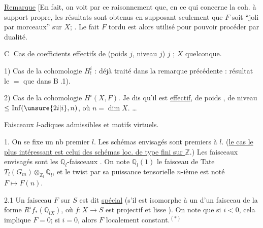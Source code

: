 
\uline{Remarque} [En fait, on voit par ce raisonnement que, en ce qui concerne la coh. à support propre, les résultats sont obtenus en supposant seulement que $F$ soit ``joli par morceaux'' sur $X$; . Le fait $F$  tordu  est alors utilisé  pour pouvoir procéder par dualité.

\textcircled{C} \uline{Cas de coefficients effectifs de (poids $j$, niveau $j$)} $j$ \uline{};
$X$ quelconque.

1) Cas de la cohomologie $H^i_!$ : déjà traité dans la remarque précédente : résultat le $=$ que dans \textcircled{B}.1).

2) Cas de la cohomologie $H^i(X,F)$. Je dis qu'il est \uline{effectif}, de poids  , de niveau $\le\operatorname{Inf}(\unsure{2i|i},n)$, où $n=\dim X$.  \ldots


Faisceaux $l$-adiques admissibles et motifs virtuels.


1. On se fixe un nb premier $l$. Les schémas envisagés sont premiers à $l$. (\uline{le cas le plus intéressant est celui des schémas loc. de type fini sur $\mathbb Z$}.) Les faisceaux envisagés sont les $\mathbb Q_l$-faisceaux . On note $\mathbb Q_l(1)$ le faisceau de Tate $T_l(G_m)\otimes_{\mathbb Z_l}\mathbb Q_l$, et le twist par sa puissance tensorielle $n$-ième est noté $F\longmapsto F(n)$.



2.1 Un faisceau $F$ sur $S$ est dit \uline{spécial}  (s'il est isomorphe à un   d'un  faisceau  de la forme $R^i f_*(\mathbb Q_{lX})$, où $f:X\longrightarrow S$ est projectif et lisse ). On note que si $i<0$, cela implique $F=0$; si $i=0$, alors    $F$ localement constant.$^{(*)}$

